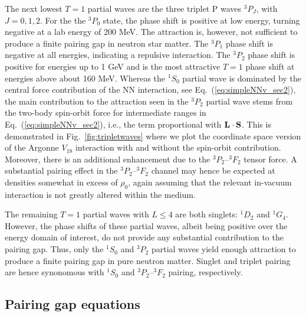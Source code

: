\documentclass[rmp,preprint,aps,floatfix]{revtex4}
\begin{document}
The next lowest $T=1$ partial waves are the three triplet 
P waves $^3P_J$, with $J=0,1,2$.
For the the $^3P_0$ state, the
phase shift is positive  at low energy, turning
negative  at a lab energy of 200 MeV. The attraction is, however,
not sufficient to produce a finite pairing gap
in neutron star matter. The $^3P_1$ phase
shift is negative  at all energies, indicating a repulsive 
interaction.  The
$^3P_2$ phase shift is positive for energies up to 1 GeV and 
is the most attractive $T=1$ phase shift at energies above
about 160 MeV.  
Whereas the $^1S_0$ partial wave is dominated by the central force 
contribution of the NN interaction, see Eq.~(\ref{eq:simpleNNv_sec2}),
the main contribution to the attraction seen in the  
$^3P_2$ partial wave stems from the two-body spin-orbit force
for intermediate ranges
in Eq.~(\ref{eq:simpleNNv_sec2}), i.e., the term proportional with
${\bf L}\cdot {\bf S}$. This is demonstrated in 
Fig.~\ref{fig:tripletwaves} where we plot the coordinate space
version of the Argonne $V_{18}$ interaction \cite{v18} 
with and without the
spin-orbit contribution. Moreover, there is an additional enhancement
due to the $^3P_2$--$^3F_2$ tensor force.  
A substantial pairing effect in the
$^3P_2$--$^3F_2$ channel may hence be expected at densities somewhat 
in excess of $\rho_0$, again assuming that the relevant in-vacuum 
interaction is not greatly altered within the medium.  


The remaining $T=1$ partial waves with $L\leq 4$ are both
singlets: $^1D_2$ and $^1G_4$.  However, the phase shifts of
these partial waves, albeit being positive over the energy domain of interest,
do not provide any substantial contribution to the pairing gap.
Thus, 
only the $^1S_0$ and $^3P_2$ partial waves yield enough attraction
to produce a finite pairing gap in pure neutron matter.
Singlet and triplet pairing are hence synonomous with 
$^1S_0$ and $^3P_2$--$^3F_2$ pairing, respectively.

\subsection{Pairing gap equations}
\end{document}

